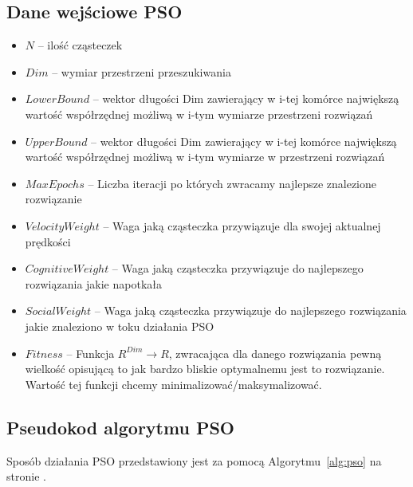 \documentclass{../llncs_template_final/llncs}
\begin{document}
\subsection{Dane wejściowe PSO}
\begin{itemize}
\item $N$ -- ilość cząsteczek
\item $Dim$ -- wymiar przestrzeni przeszukiwania
\item $LowerBound$ -- wektor długości Dim zawierający w i-tej komórce największą wartość współrzędnej możliwą w i-tym wymiarze przestrzeni rozwiązań
\item $UpperBound$ -- wektor długości Dim zawierający w i-tej komórce największą wartość współrzędnej możliwą w i-tym wymiarze w przestrzeni rozwiązań
\item $MaxEpochs$ -- Liczba iteracji po których zwracamy najlepsze znalezione rozwiązanie
\item $VelocityWeight$ -- Waga jaką cząsteczka przywiązuje dla swojej aktualnej prędkości
\item $CognitiveWeight$ -- Waga jaką cząsteczka przywiązuje do najlepszego rozwiązania jakie napotkała
\item $SocialWeight$ -- Waga jaką cząsteczka przywiązuje do najlepszego rozwiązania jakie znaleziono w toku działania PSO
\item $Fitness$ -- Funkcja $R^{Dim} \rightarrow R$, zwracająca dla danego rozwiązania pewną wielkość opisującą to jak bardzo bliskie optymalnemu jest to rozwiązanie. Wartość tej funkcji chcemy minimalizować/maksymalizować. 
\end{itemize}

\subsection*{Pseudokod algorytmu PSO}

Sposób działania PSO przedstawiony jest za pomocą Algorytmu~\ref{alg:pso} na stronie \pageref{alg:pso}.
\end{document}
